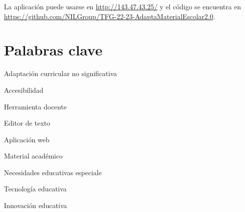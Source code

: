 La aplicación puede usarse en \url{http://143.47.43.25/} y el código se encuentra en \url{https://github.com/NILGroup/TFG-22-23-AdaptaMaterialEscolar2.0}.

\section*{Palabras clave}

Adaptación curricular no significativa

Accesibilidad

Herramienta docente

Editor de texto

Aplicación web

Material académico

Necesidades educativas especiale

Tecnología educativa

Innovación educativa
   


